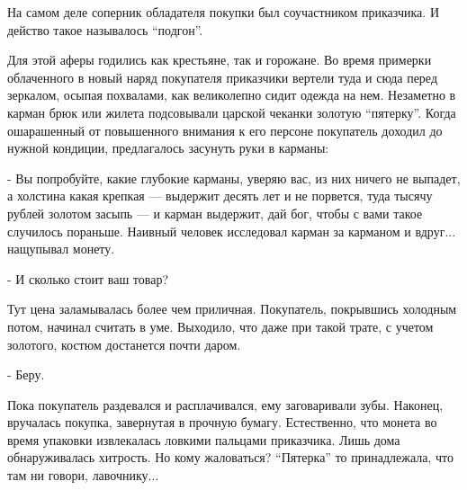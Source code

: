 На самом деле соперник обладателя покупки был соучастником приказчика. И
действо такое называлось \enquote{подгон}.

Для этой аферы годились как крестьяне, так и горожане. Во время примерки
облаченного в новый наряд покупателя приказчики вертели туда и сюда перед
зеркалом, осыпая похвалами, как великолепно сидит одежда на нем. Незаметно в
карман брюк или жилета подсовывали царской чеканки золотую \enquote{пятерку}. Когда
ошарашенный от повышенного внимания к его персоне покупатель доходил до нужной
кондиции, предлагалось засунуть руки в карманы:

- Вы попробуйте, какие глубокие карманы, уверяю вас, из них ничего не выпадет,
а холстина какая крепкая — выдержит десять лет и не порвется, туда тысячу
рублей золотом засыпь — и карман выдержит, дай бог, чтобы с вами такое
случилось пораньше. Наивный человек исследовал карман за карманом и вдруг...
нащупывал монету.

- И сколько стоит ваш товар?

Тут цена заламывалась более чем приличная. Покупатель, покрывшись холодным
потом, начинал считать в уме. Выходило, что даже при такой трате, с учетом
золотого, костюм достанется почти даром.

- Беру.  

Пока покупатель раздевался и расплачивался, ему заговаривали зубы. Наконец,
вручалась покупка, завернутая в прочную бумагу. Естественно, что монета во
время упаковки извлекалась ловкими пальцами приказчика. Лишь дома
обнаруживалась хитрость. Но кому жаловаться? \enquote{Пятерка} то принадлежала, что там
ни говори, лавочнику...
